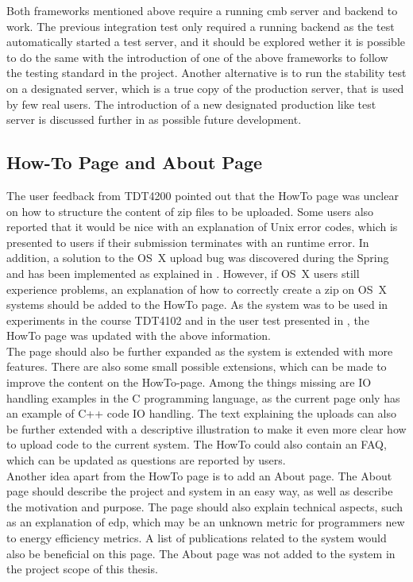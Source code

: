 Both frameworks mentioned above require a running \gls{cmb} server and backend to work. The previous integration test only required a running backend as the test automatically started a test server, and it should be explored wether it is possible to do the same with the introduction of one of the above frameworks to follow the testing standard in the project. Another alternative is to run the stability test on a designated server, which is a true copy of the production server, that is used by few real users. The introduction of a new designated production like test server is discussed further in  as possible future development.

\subsection{How-To Page and About Page}
\label{sub-sec:prop-howto}
The user feedback from TDT4200 \cite{TDT4200} pointed out that the HowTo page was unclear on how to structure the content of zip files to be uploaded. Some users also reported that it would be nice with an explanation of Unix error codes, which is presented to users if their submission terminates with an runtime error. In addition, a solution to the OS~X upload bug was discovered during the Spring and has been implemented as explained in . However, if OS~X users still experience problems, an explanation of how to correctly create a zip on OS~X systems should be added to the HowTo page. As the system was to be used in experiments in the course TDT4102 \cite{TDT4102} and in the user test presented in , the HowTo page was updated with the above information. \\

The page should also be further expanded as the system is extended with more features. There are also some small possible extensions, which can be made to improve the content on the HowTo-page. Among the things missing are IO handling examples in the C programming language, as the current page only has an example of C++ code IO handling. The text explaining the uploads can also be further extended with a descriptive illustration to make it even more clear how to upload code to the current system. The HowTo could also contain an FAQ, which can be updated as questions are reported by users. \\

Another idea apart from the HowTo page is to add an About page. The About page should describe the project and system in an easy way, as well as describe the motivation and purpose. The page should also explain technical aspects, such as an explanation of \gls{edp}, which may be an unknown metric for programmers new to energy efficiency metrics. A list of publications related to the system would also be beneficial on this page. The About page was not added to the system in the project scope of this thesis.

